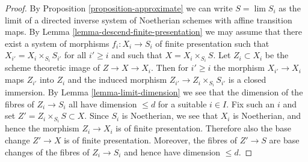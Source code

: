 \documentclass[10pt,a4paper]{amsart}
\theoremstyle{plain}
\theoremstyle{definition}
\theoremstyle{remark}
\numberwithin{equation}{subsection}
\def\lim{\mathop{\mathrm{lim}}\nolimits}
\begin{document}
\begin{proof}
By
Proposition \ref{proposition-approximate}
we can write $S = \lim S_i$ as the limit of a directed inverse
system of Noetherian schemes with affine transition maps. By
Lemma \ref{lemma-descend-finite-presentation}
we may assume that there exist a system of morphisms
$f_i : X_i \to S_i$ of finite presentation such that
$X_{i'} = X_i \times_{S_i} S_{i'}$
for all $i' \geq i$ and such that $X = X_i \times_{S_i} S$.
Let $Z_i \subset X_i$ be the scheme theoretic image of
$Z \to X \to X_i$. Then for $i' \geq i$ the morphism $X_{i'} \to X_i$
maps $Z_{i'}$ into $Z_i$ and the induced morphism
$Z_{i'} \to Z_i \times_{S_i} S_{i'}$ is a closed immersion. By
Lemma \ref{lemma-limit-dimension}
we see that the dimension of the fibres of $Z_i \to S_i$
all have dimension $\leq d$ for a suitable $i \in I$.
Fix such an $i$ and set $Z' = Z_i \times_{S_i} S \subset X$.
Since $S_i$ is Noetherian, we see that $X_i$ is Noetherian, and hence
the morphism $Z_i \to X_i$ is of finite presentation.
Therefore also the base change $Z' \to X$ is of finite presentation.
Moreover, the fibres of $Z' \to S$ are base changes of the fibres
of $Z_i \to S_i$ and hence have dimension $\leq d$.
\end{proof}
\end{document}
